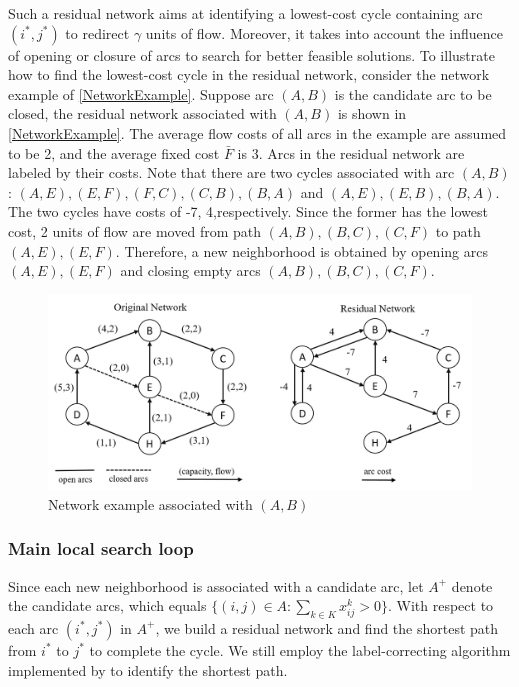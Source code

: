 \documentclass[11pt,nonblindrev,fleqn]{article}
\begin{document}
Such a residual network aims at identifying a lowest-cost cycle containing arc $(i^*,j^*)$ to redirect $\gamma$ units of flow. Moreover, it takes into account the influence of opening or closure of arcs to search for better feasible solutions. To illustrate how to find the lowest-cost cycle in the residual network, consider the network example of \autoref{NetworkExample}. Suppose arc $(A,B)$ is the candidate arc to be closed, the residual network associated with $(A,B)$ is shown in \autoref{NetworkExample}. The average flow costs of all arcs in the example are assumed to be 2, and the average fixed cost $\bar{F}$ is 3. Arcs in the residual network are labeled by their costs. Note that there are two cycles associated with arc $(A,B)$: $(A,E),(E,F),(F,C),(C,B),(B,A)$ and $(A,E),(E,B),(B,A)$. The two cycles have costs of -7, 4,respectively. Since the former has the lowest cost, 2 units of flow are moved from path $(A,B),(B,C),(C,F)$ to path $(A,E),(E,F)$. Therefore, a new neighborhood is obtained by opening arcs $(A,E),(E,F)$ and closing empty arcs $(A,B),(B,C),(C,F)$.
\begin{figure}[H]
\setlength{\abovecaptionskip}{-5pt}
\setlength{\belowcaptionskip}{-5pt}
\centering
\includegraphics[width=0.9\linewidth]{F3.png}
\caption{Network example associated with $(A,B)$}
\label{NetworkExample}
\end{figure}

\subsubsection{Main local search loop}
Since each new neighborhood is associated with a candidate arc, let $A^+$ denote the candidate arcs, which equals $\{ (i,j)\in A: \sum_{k\in K} x_{ij}^k > 0 \}$. With respect to each arc $(i^*,j^*)$ in $A^+$, we build a residual network and find the shortest path from $i^*$ to $j^*$ to complete the cycle. We still employ the label-correcting algorithm implemented by \cite{Ahuja1993Network} to identify the shortest path.
\end{document}
